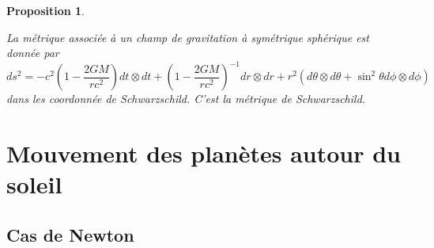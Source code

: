 \documentclass[a4paper,11pt]{report}
\theoremstyle{definition}
\theoremstyle{plain}
\newtheorem{prop}[thm]{Proposition}
\theoremstyle{definition}
\theoremstyle{remark}
\begin{document}
        \begin{prop}\begin{leftbar}
            La métrique associée à un champ de gravitation à symétrique sphérique est donnée par
            \begin{equation}
                ds^2 = -c^2\left( 1-\frac{2GM}{rc^2} \right)dt\otimes dt + \left( 1-\frac{2GM}{rc^2} \right)^{-1}dr\otimes dr + r^2(d\theta\otimes d\theta+\sin^2\theta d\phi\otimes d\phi)
            \end{equation}
            dans les coordonnée de Schwarzschild. C'est la \textit{métrique de Schwarzschild}.
        \end{leftbar}\end{prop}

    \section{Mouvement des planètes autour du soleil}
    
        \subsection{Cas de Newton}
        
\end{document}
